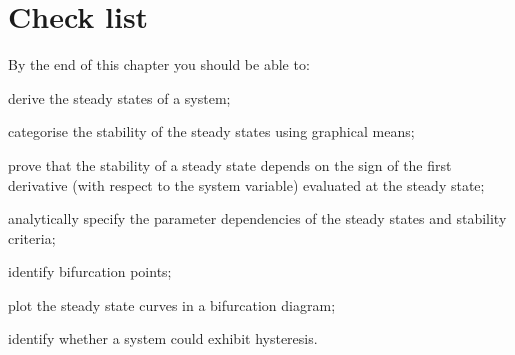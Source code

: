 \section{Check list}
By the end of this chapter you should be able to:
\begin{todolist}
\item derive the steady states of a system;
\item categorise the stability of the steady states using graphical means;
\item prove that the stability of a steady state depends on the sign of the first derivative (with respect to the system variable) evaluated at the steady state;
\item analytically specify the parameter dependencies of the steady states and stability criteria;
\item identify bifurcation points;
\item plot the steady state curves in a bifurcation diagram;
\item identify whether a system could exhibit hysteresis. 
\end{todolist}






